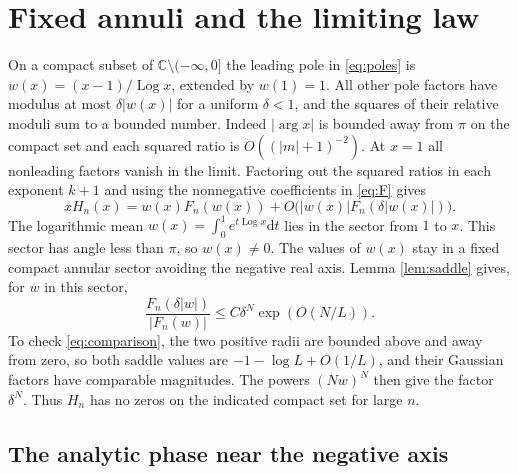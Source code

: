 \documentclass[11pt]{article}
\DeclareMathOperator{\Arg}{arg}
\newcommand{\dd}{\mathrm d}
\newcommand{\Log}{\operatorname{Log}}
\newcommand{\CC}{\mathbb C}
\begin{document}
\section{Fixed annuli and the limiting law}\label{sec:annuli}

On a compact subset of \(\CC\setminus(-\infty,0]\) the leading pole in \eqref{eq:poles} is \(w(x)=(x-1)/\Log x\), extended by \(w(1)=1\). All other pole factors have modulus at most \(\delta |w(x)|\) for a uniform \(\delta<1\), and the squares of their relative moduli sum to a bounded number. Indeed \(|\Arg x|\) is bounded away from \(\pi\) on the compact set and each squared ratio is \(O((|m|+1)^{-2})\). At \(x=1\) all nonleading factors vanish in the limit. Factoring out the squared ratios in each exponent \(k+1\) and using the nonnegative coefficients in \eqref{eq:F} gives
\begin{equation}\label{eq:onepole}
 xH_n(x)=w(x)F_n(w(x))+O\bigl(|w(x)|F_n(\delta |w(x)|)\bigr).
\end{equation}
The logarithmic mean \(w(x)=\int_0^1 e^{t\Log x}\dd t\) lies in the sector from \(1\) to \(x\). This sector has angle less than \(\pi\), so \(w(x)\ne0\). The values of \(w(x)\) stay in a fixed compact annular sector avoiding the negative real axis. Lemma \ref{lem:saddle} gives, for \(w\) in this sector,
\begin{equation}\label{eq:comparison}
 \frac{F_n(\delta |w|)}{|F_n(w)|}\le C\delta^N\exp(O(N/L)).
\end{equation}
To check \eqref{eq:comparison}, the two positive radii are bounded above and away from zero, so both saddle values are \(-1-\log L+O(1/L)\), and their Gaussian factors have comparable magnitudes. The powers \((Nw)^N\) then give the factor \(\delta^N\). Thus \(H_n\) has no zeros on the indicated compact set for large \(n\).

\subsection{The analytic phase near the negative axis}
\end{document}
